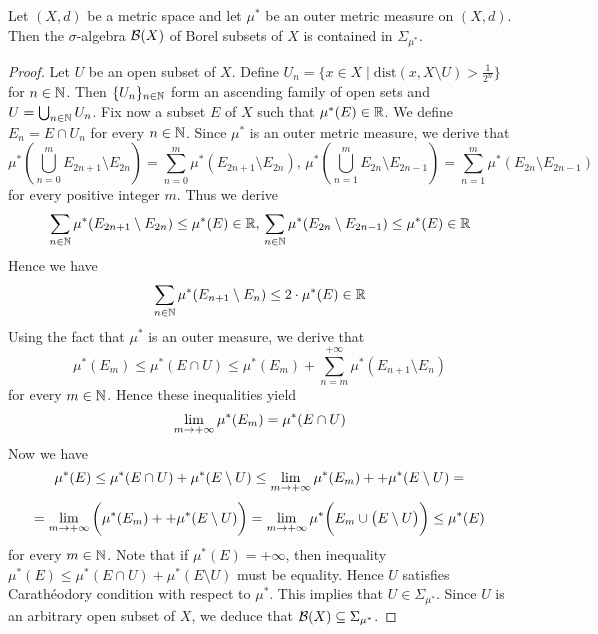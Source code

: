 \begin{theorem}
Let $(X,d)$ be a metric space and let $\mu^*$ be an outer metric measure on $(X,d)$. Then the $\sigma$-algebra ${\mathcal B}(X)$ of Borel subsets of $X$ is contained in $\Sigma_{\mu^*}$.
\end{theorem}
\begin{proof}
Let $U$ be an open subset of $X$. Define $U_n=\big\{x\in X\mid \mathrm{dist}\left(x,X\setminus U\right)>\frac{1}{2^n}\big\}$ for $n\in {\mathbb N}$. Then $\{U_n\}_{n\in {\mathbb N}}$ form an ascending family of open sets and $U=\bigcup_{n\in {\mathbb N}}U_n$. Fix now a subset $E$ of $X$ such that $\mu^*(E)\in {\mathbb R}$. We define $E_n=E\cap U_n$ for every $n\in {\mathbb N}$. Since $\mu^*$ is an outer metric measure, we derive that
$$\mu^*\left(\bigcup_{n=0}^mE_{2n+1}\setminus E_{2n}\right)=\sum_{n=0}^m\mu^*(E_{2n+1}\setminus E_{2n}),\,\mu^*\left(\bigcup_{n=1}^mE_{2n}\setminus E_{2n-1}\right)=\sum_{n=1}^m\mu^*(E_{2n}\setminus E_{2n-1})$$
for every positive integer $m$. Thus we derive 
$$\sum_{n\in {\mathbb N}}\mu^*(E_{2n+1}\setminus E_{2n})\leq \mu^*(E)\in {\mathbb R},\,\sum_{n\in {\mathbb N}}\mu^*(E_{2n}\setminus E_{2n-1})\leq \mu^*(E)\in {\mathbb R}$$
Hence we have
$$\sum_{n\in {\mathbb N}}\mu^*(E_{n+1}\setminus E_{n})\leq 2\cdot \mu^*(E)\in {\mathbb R}$$
Using the fact that $\mu^*$ is an outer measure, we derive that
$$\mu^*(E_m)\leq \mu^*(E\cap U)\leq \mu^*(E_m)+\sum_{n=m}^{+\infty}\mu^*(E_{n+1}\setminus E_n)$$
for every $m\in {\mathbb N}$. Hence these inequalities yield
$$\lim_{m\rightarrow +\infty}\mu^*(E_m)=\mu^*(E\cap U)$$
Now we have 
$$\mu^*(E)\leq \mu^*(E\cap U)+\mu^*(E\setminus U) \leq \lim_{m\rightarrow +\infty}\mu^*(E_m) + + \mu^*(E\setminus U) = $$
$$= \lim_{m\rightarrow +\infty}\bigg(\mu^*(E_m) + + \mu^*(E\setminus U)\bigg) = \lim_{m\rightarrow +\infty}\mu^*\bigg(E_m\cup \big(E\setminus U\big)\bigg) \leq \mu^*(E)$$ 
for every $m\in {\mathbb N}$. Note that if $\mu^*(E)=+\infty$, then inequality $\mu^*(E)\leq \mu^*(E\cap U)+\mu^*(E\setminus U)$ must be equality. Hence $U$ satisfies Carath{\'e}odory condition with respect to $\mu^*$. This implies that $U \in \Sigma_{\mu^*}$. Since $U$ is an arbitrary open subset of $X$, we deduce that ${\mathcal B}(X)\subseteq \Sigma_{\mu^*}$.
\end{proof}































































